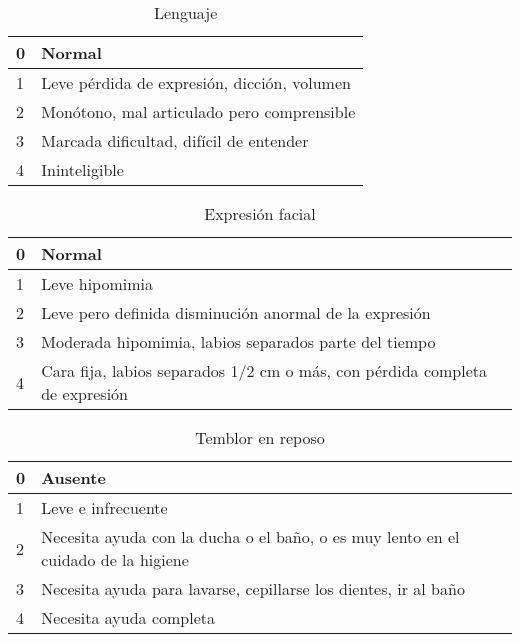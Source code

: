 \begin{table}[H]
\begin{center}
\begin{tabular}{|p{1cm}|p{11cm}|}
\hline
0 & Normal \\\hline
1 & Leve pérdida de expresión, dicción, volumen \\\hline
2 & Monótono, mal articulado pero comprensible\\\hline
3 & Marcada dificultad, difícil de entender \\\hline
4 & Ininteligible\\\hline
\end{tabular}
\caption{Lenguaje}
\end{center}
\end{table}

\begin{table}[H]
\begin{center}
\begin{tabular}{|p{1cm}|p{11cm}|}
\hline
0 & Normal \\\hline
1 & Leve hipomimia \\\hline
2 & Leve pero definida disminución anormal de la expresión\\\hline
3 & Moderada hipomimia, labios separados parte del tiempo \\\hline
4 & Cara fija, labios separados 1/2 cm o más, con pérdida completa de expresión \\\hline
\end{tabular}
\caption{Expresión facial}
\end{center}
\end{table}

\begin{table}[H]
\begin{center}
\begin{tabular}{|p{1cm}|p{11cm}|}
\hline
0 & Ausente \\\hline
1 & Leve e infrecuente \\\hline
2 & Necesita ayuda con la ducha o el baño, o es muy lento en el cuidado de la higiene\\\hline
3 & Necesita ayuda para lavarse, cepillarse los dientes, ir al baño \\\hline
4 & Necesita ayuda completa \\\hline
\end{tabular}
\caption{Temblor en reposo}
\end{center}
\end{table}

